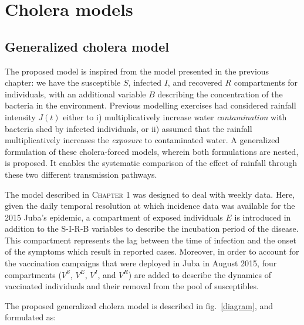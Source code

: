 \section{Cholera models}
\label{sec:meth}
\subsection{Generalized cholera model}
The proposed model is inspired from the model presented in the previous chapter: we have the susceptible $S$, infected $I$, and recovered $R$ compartments for individuals, with an additional variable $B$ describing the concentration of the bacteria in the environment. Previous modelling exercises had considered rainfall intensity $J(t)$ either to i) multiplicatively increase water \textit{contamination} with bacteria shed by infected  individuals\cite{Bertuzzo:ProbabilityExtinctionHaiti:2016,Pasetto:RealtimeProjectionsCholera:2017}, or ii) assumed that the rainfall multiplicatively increases the \textit{exposure} to contaminated water\cite{Eisenberg:ExaminingRainfallCholera:2013}. A generalized formulation of these cholera-forced models, wherein both formulations are nested, is proposed. It enables the systematic comparison of the effect of rainfall through these two different transmission pathways.

The model described in \textsc{Chapter 1} was designed to deal with weekly data. Here, given the daily temporal resolution at which incidence data was available for the 2015 Juba's epidemic, a compartment of exposed individuals $E$ is introduced in addition to the S-I-R-B variables to describe the incubation period of the disease. This compartment represents the lag between the time of infection and the onset of the symptoms which result in reported cases. Moreover, in order to account for the vaccination campaigns that were deployed in Juba in August 2015, four compartments ($V^S$, $V^E$, $V^I$, and $V^R$) are added to describe the dynamics of vaccinated individuals and their removal from the pool of susceptibles.

The proposed generalized cholera model is described in fig.~\ref{diagram}, and formulated as:

